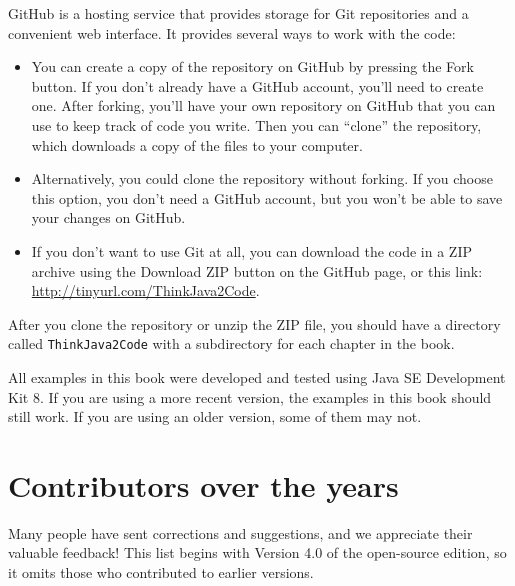 
GitHub is a hosting service that provides storage for Git repositories and a convenient web interface.
It provides several ways to work with the code:

\begin{itemize}

\item You can create a copy of the repository on GitHub by pressing the {\sf Fork} button.
If you don't already have a GitHub account, you'll need to create one.
After forking, you'll have your own repository on GitHub that you can use to keep track of code you write.
Then you can ``clone'' the repository, which downloads a copy of the files to your computer.

\item Alternatively, you could clone the repository without forking.
If you choose this option, you don't need a GitHub account, but you won't be able to save your changes on GitHub.

\item If you don't want to use Git at all, you can download the code in a ZIP archive using the {\sf Download ZIP} button on the GitHub page, or this link: \url{http://tinyurl.com/ThinkJava2Code}.

\end{itemize}

After you clone the repository or unzip the ZIP file, you should have a directory called {\tt ThinkJava2Code} with a subdirectory for each chapter in the book.

All examples in this book were developed and tested using Java SE Development Kit 8.
If you are using a more recent version, the examples in this book should still work.
If you are using an older version, some of them may not.


\section*{Contributors over the years}

Many people have sent corrections and suggestions, and we appreciate their valuable feedback!
This list begins with Version 4.0 of the open-source edition, so it omits those who contributed to earlier versions.

